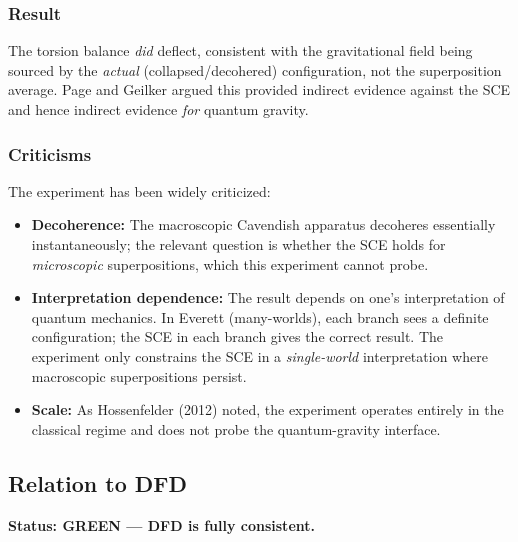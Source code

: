 \documentclass[12pt,a4paper]{article}
\newcommand{\GREEN}{\textcolor{dfdgreen}{\textbf{GREEN}}}
\begin{document}
\subsubsection{Result}

The torsion balance \emph{did} deflect, consistent with the gravitational field being sourced by the \emph{actual} (collapsed/decohered) configuration, not the superposition average. Page and Geilker argued this provided indirect evidence against the SCE and hence indirect evidence \emph{for} quantum gravity.

\subsubsection{Criticisms}

The experiment has been widely criticized:
\begin{itemize}
\item \textbf{Decoherence:} The macroscopic Cavendish apparatus decoheres essentially instantaneously; the relevant question is whether the SCE holds for \emph{microscopic} superpositions, which this experiment cannot probe.
\item \textbf{Interpretation dependence:} The result depends on one's interpretation of quantum mechanics. In Everett (many-worlds), each branch sees a definite configuration; the SCE in each branch gives the correct result. The experiment only constrains the SCE in a \emph{single-world} interpretation where macroscopic superpositions persist.
\item \textbf{Scale:} As Hossenfelder (2012) noted, the experiment operates entirely in the classical regime and does not probe the quantum-gravity interface.
\end{itemize}

\subsection{Relation to DFD}

\textbf{Status: \GREEN{} --- DFD is fully consistent.}
\end{document}

